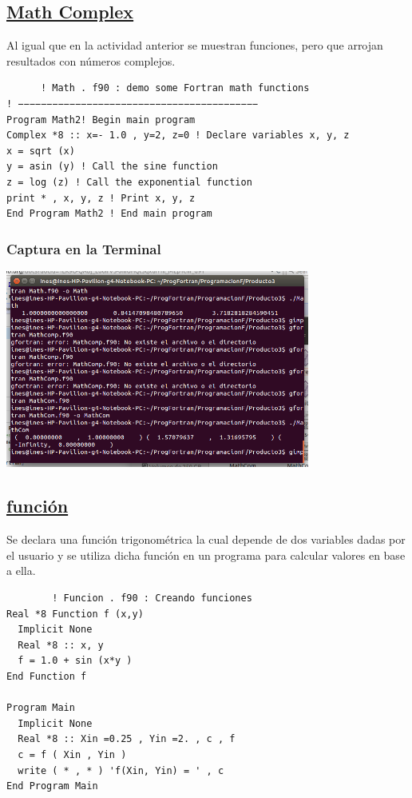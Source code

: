 \documentclass[a4paper]{article}
\begin{document}
 \subsection{\underline{Math Complex}}
 
Al igual que en la actividad anterior se muestran funciones, pero que arrojan resultados con números complejos.
  \begin{verbatim}
      ! Math . f90 : demo some Fortran math functions
! −−−−−−−−−−−−−−−−−−−−−−−−−−−−−−−−−−−−−−−−−−
Program Math2! Begin main program
Complex *8 :: x=- 1.0 , y=2, z=0 ! Declare variables x, y, z
x = sqrt (x)
y = asin (y) ! Call the sine function
z = log (z) ! Call the exponential function
print * , x, y, z ! Print x, y, z
End Program Math2 ! End main program
\end{verbatim}
 \subsubsection{Captura en la Terminal}
 \begin{center}
\includegraphics[width=10cm]{MathCom.png}
\end{center}
      
    
\subsection{\underline{función}}
  Se declara una función trigonométrica la cual depende de dos variables dadas por el usuario y se utiliza dicha función en un programa para calcular valores en base a ella.
  
 \begin{verbatim}
        ! Funcion . f90 : Creando funciones
Real *8 Function f (x,y)
  Implicit None
  Real *8 :: x, y
  f = 1.0 + sin (x*y )
End Function f

Program Main
  Implicit None
  Real *8 :: Xin =0.25 , Yin =2. , c , f
  c = f ( Xin , Yin )
  write ( * , * ) 'f(Xin, Yin) = ' , c
End Program Main
    \end{verbatim}
 
\end{document}
